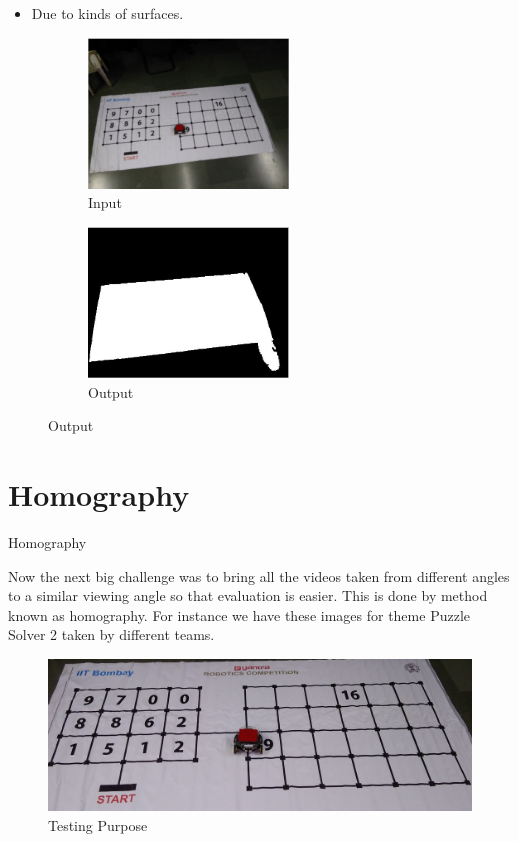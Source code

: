 \documentclass[10pt, a4paper]{beamer}
\begin{document}
\begin{frame}
	\begin{itemize}
		\item {Due to kinds of surfaces.}
	\end{itemize}
	
	\begin{figure}[h!]
		\begin{subfigure}{0.4\textwidth}
			\includegraphics[width=1\linewidth, height=4cm]{Filtering/challenges/2.jpg}
			\caption{Input}
		\end{subfigure}
		\begin{subfigure}{0.4\textwidth}
			\includegraphics[width=1\linewidth, height=4cm]{Filtering/challenges/22.jpg}
			\caption{Output}
		\end{subfigure}
	\end{figure}	
\end{frame}

\section{Homography}
\begin{frame}{\begin{center}
			Homography
		\end{center}}\vspace{-1 cm}
		Now the next big challenge was to bring all the videos taken from different angles to a similar viewing angle so that evaluation is easier. This is done by method known as homography. For instance we have these images for theme Puzzle Solver 2 taken by different teams.
		\begin{figure}[h!]
			\includegraphics[scale=0.1]{Homography/1.jpg}
			\centering
			\caption{Testing Purpose}
		\end{figure}	
		
\end{frame}
\end{document}
